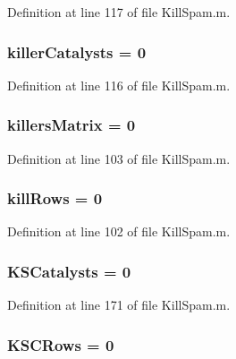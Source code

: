 Definition at line 117 of file Kill\-Spam.\-m.

\hypertarget{a00029_a1a42aaee01b2cc37a3835e0fe30cf9d3}{
\subsubsection[{killer\-Catalysts}]{\setlength{\rightskip}{0pt plus 5cm}killer\-Catalysts = 0}}\label{a00029_a1a42aaee01b2cc37a3835e0fe30cf9d3}


Definition at line 116 of file Kill\-Spam.\-m.

\hypertarget{a00029_a929016802e1ede2217a41240a6974fa6}{
\subsubsection[{killers\-Matrix}]{\setlength{\rightskip}{0pt plus 5cm}killers\-Matrix = 0}}\label{a00029_a929016802e1ede2217a41240a6974fa6}


Definition at line 103 of file Kill\-Spam.\-m.

\hypertarget{a00029_a747bc1d10158c78e88e314825ed41a13}{
\subsubsection[{kill\-Rows}]{ kill\-Rows = 0}}\label{a00029_a747bc1d10158c78e88e314825ed41a13}


Definition at line 102 of file Kill\-Spam.\-m.

\hypertarget{a00029_a25c085d4378366ed81f0f97547802c8f}{
\subsubsection[{K\-S\-Catalysts}]{\setlength{\rightskip}{0pt plus 5cm}K\-S\-Catalysts = 0}}\label{a00029_a25c085d4378366ed81f0f97547802c8f}


Definition at line 171 of file Kill\-Spam.\-m.

\hypertarget{a00029_a56aa0b3ac00410dc36f9043c641ae205}{
\subsubsection[{K\-S\-C\-Rows}]{\setlength{\rightskip}{0pt plus 5cm}K\-S\-C\-Rows = 0}}\label{a00029_a56aa0b3ac00410dc36f9043c641ae205}


